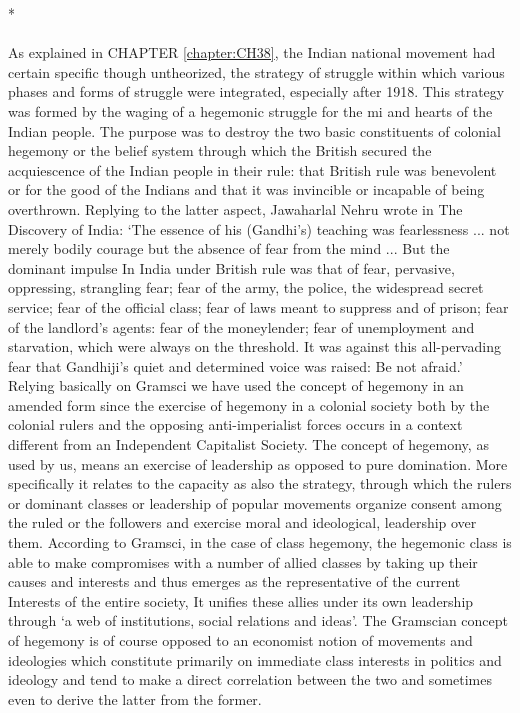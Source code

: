 \begin{center}*\end{center}

\paragraph*{}
As explained in CHAPTER \ref{chapter:CH38}, the Indian national movement had certain specific though untheorized, the strategy of struggle within which various phases and forms of struggle were integrated, especially after 1918. This strategy was formed by the waging of a hegemonic struggle for the mi and hearts of the Indian people. The purpose was to destroy the two basic constituents of colonial hegemony or the belief system through which the British secured the acquiescence of the Indian people in their rule: that British rule was benevolent or for the good of the Indians and that it was invincible or incapable of being overthrown. Replying to the latter aspect, Jawaharlal Nehru wrote in The Discovery of India: `The essence of his (Gandhi's) teaching was fearlessness ... not merely bodily courage but the absence of fear from the mind ... But the dominant impulse In India under British rule was that of fear, pervasive, oppressing, strangling fear; fear of the army, the police, the widespread secret service; fear of the official class; fear of laws meant to suppress and of prison; fear of the landlord's agents: fear of the money­lender; fear of unemployment and starvation, which were always on the threshold. It was against this all-pervading fear that Gandhiji's quiet and determined voice was raised: Be not afraid.' Relying basically on Gramsci we have used the concept of hegemony in an amended form since the exercise of hegemony in a colonial society both by the colonial rulers and the opposing anti-imperialist forces occurs in a context different from an Independent Capitalist Society. The concept of hegemony, as used by us, means an exercise of leadership as opposed to pure domination. More specifically it relates to the capacity as also the strategy, through which the rulers or dominant classes or leadership of popular movements organize consent among the ruled or the followers and exercise moral and ideological, leadership over them. According to Gramsci, in the case of class hegemony, the hegemonic class is able to make compromises with a number of allied classes by taking up their causes and interests and thus emerges as the representative of the current Interests of the entire society, It unifies these allies under its own leadership through `a web of institutions, social relations and ideas'. The Gramscian concept of hegemony is of course opposed to an economist notion of movements and ideologies which constitute primarily on immediate class interests in politics and ideology and tend to make a direct correlation between the two and sometimes even to derive the latter from the former.

